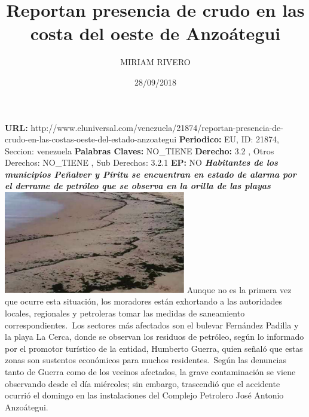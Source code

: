 \documentclass{article}%
\title{\textbf{Reportan presencia de crudo en las costa del oeste de Anzoátegui}}%
\author{MIRIAM RIVERO}%
\date{28/09/2018}%
\begin{document}
%
\normalsize%
\maketitle%
\textbf{URL: }%
http://www.eluniversal.com/venezuela/21874/reportan{-}presencia{-}de{-}crudo{-}en{-}las{-}costas{-}oeste{-}del{-}estado{-}anzoategui\newline%
%
\textbf{Periodico: }%
EU, %
ID: %
21874, %
Seccion: %
venezuela\newline%
%
\textbf{Palabras Claves: }%
NO\_TIENE\newline%
%
\textbf{Derecho: }%
3.2%
, Otros Derechos: %
NO\_TIENE%
, Sub Derechos: %
3.2.1%
\newline%
%
\textbf{EP: }%
NO\newline%
\newline%
%
\textbf{\textit{Habitantes de los municipios Peñalver y Píritu se encuentran en estado de alarma por el derrame de petróleo que se observa en la orilla de las playas}}%
\newline%
\newline%
%
\includegraphics[width=300px]{256.jpg}%
\newline%
%
Aunque no es la primera vez que ocurre esta situación, los moradores están exhortando a las autoridades locales, regionales y petroleras tomar las medidas de saneamiento correspondientes.~Los sectores más afectados son el bulevar Fernández Padilla y la playa La Cerca, donde se observan los residuos de petróleo, según lo informado por el promotor turístico de la entidad, Humberto Guerra, quien señaló que estas zonas son sustentos económicos para muchos residentes.~Según las denuncias tanto de Guerra como de los vecinos afectados, la grave contaminación se viene observando desde el día miércoles; sin embargo, trascendió que el accidente ocurrió el domingo en las instalaciones del Complejo Petrolero José Antonio Anzoátegui.%
\newline%
%
\end{document}

